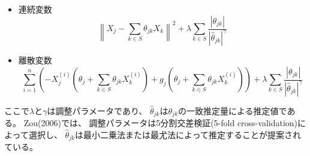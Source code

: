 \begin{itemize}
  \item
    連続変数
    \begin{equation*}
      \left\| X_j - \sum_{k \in S} \theta_{jk}X_k \right\|^2
        + \lambda \sum_{k\in S} \frac{|\theta_{jk}|}{|\widehat{\theta}_{jk}|^\gamma}
    \end{equation*}
  \item
    離散変数
    \begin{equation*}
      \sum_{i=1}^n \left( -X_j^{(i)}\left( \theta_j + \sum_{k\in S}\theta_{jk}X_k^{(i)} \right)
        + g_j\left( \theta_j + \sum_{k\in S}\theta_{jk}X_k^{(i)} \right) \right)
        + \lambda \sum_{k\in S} \frac{|\theta_{jk}|}{|\widehat{\theta}_{jk}|^\gamma}
    \end{equation*}
\end{itemize}

ここで$\lambda$と$\gamma$は調整パラメータであり、
$\widehat{\theta}_{jk}$は$\theta_{jk}$の一致推定量による推定値である。
Zou(2006)\cite{Zou2006-pi}では、
調整パラメータは5分割交差検証(5-fold cross-validation)によって選択し、
$\widehat{\theta}_{jk}$は最小二乗法または最尤法によって推定することが提案されている。
